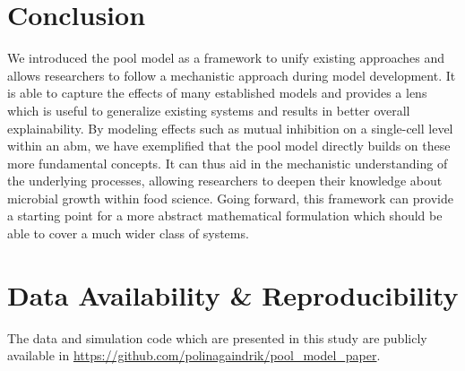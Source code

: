 \documentclass[10pt,twocolumn,5p]{elsarticle}
\numberwithin{equation}{section}
\begin{document}
\section{Conclusion}

We introduced the pool model as a framework to unify existing approaches and allows researchers to follow a mechanistic approach during model development.
It is able to capture the effects of many established models and provides a lens which is useful to generalize existing systems and results in better overall explainability.
By modeling effects such as mutual inhibition on a single-cell level within an \ac{abm}, we have exemplified that the pool model directly builds on these more fundamental concepts.
It can thus aid in the mechanistic understanding of the underlying processes, allowing researchers to deepen their knowledge about microbial growth within food science.
Going forward, this framework can provide a starting point for a more abstract mathematical formulation which should be able to cover a much wider class of systems.

\onecolumn

\newpage
\section*{Data Availability \& Reproducibility}

The data and simulation code which are presented in this study are publicly available in
\url{https://github.com/polinagaindrik/pool_model_paper}.
\end{document}
